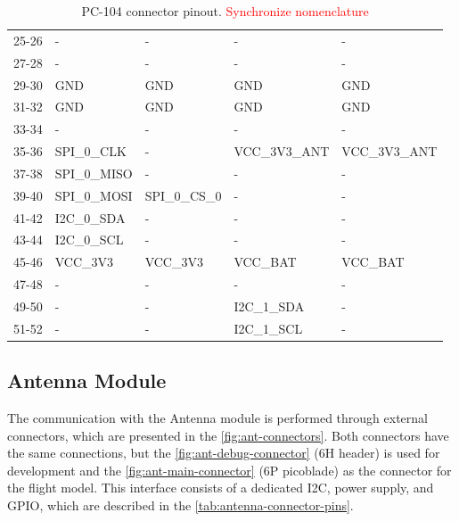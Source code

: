 \begin{table}[!h]
\begin{tabular}{cllll}
        25-26              & -                & -                & -             & -             \\
        27-28              & -                & -                & -             & -             \\
        29-30              & GND              & GND              & GND           & GND           \\
        31-32              & GND              & GND              & GND           & GND           \\
        33-34              & -                & -                & -             & -             \\
        35-36              & SPI\_0\_CLK      & -                & VCC\_3V3\_ANT & VCC\_3V3\_ANT \\
        37-38              & SPI\_0\_MISO     & -                & -             & -             \\
        39-40              & SPI\_0\_MOSI     & SPI\_0\_CS\_0    & -             & -             \\
        41-42              & I2C\_0\_SDA      & -                & -             & -             \\
        43-44              & I2C\_0\_SCL      & -                & -             & -             \\
        45-46              & VCC\_3V3         & VCC\_3V3         & VCC\_BAT      & VCC\_BAT      \\
        47-48              & -                & -                & -             & -             \\
        49-50              & -                & -                & I2C\_1\_SDA   & -             \\
        51-52              & -                & -                & I2C\_1\_SCL   & -             \\
        \bottomrule[1.5pt]
    \end{tabular}
    \caption{PC-104 connector pinout. \textcolor{red}{Synchronize nomenclature}}
    \label{tab:pc104-pins}
\end{table}

\subsection{Antenna Module}

The communication with the Antenna module is performed through external connectors, which are presented in the \autoref{fig:ant-connectors}. Both connectors have the same connections, but the \ref{fig:ant-debug-connector} (6H header) is used for development and the \ref{fig:ant-main-connector} (6P picoblade) as the connector for the flight model. This interface consists of a dedicated I2C, power supply, and GPIO, which are described in the \autoref{tab:antenna-connector-pins}.

